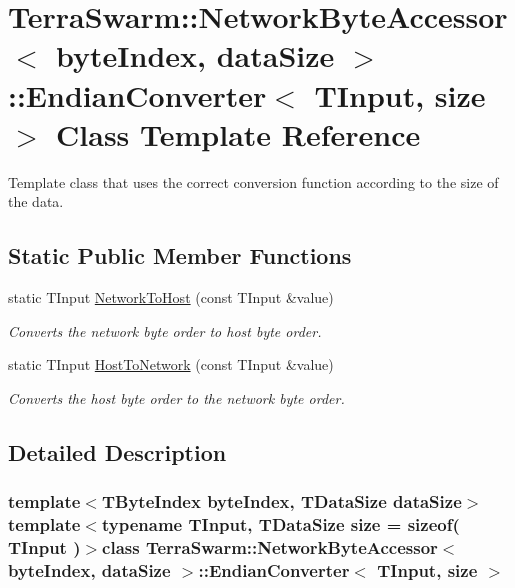 \hypertarget{class_terra_swarm_1_1_network_byte_accessor_1_1_endian_converter}{\section{Terra\-Swarm\-:\-:Network\-Byte\-Accessor$<$ byte\-Index, data\-Size $>$\-:\-:Endian\-Converter$<$ T\-Input, size $>$ Class Template Reference}
\label{class_terra_swarm_1_1_network_byte_accessor_1_1_endian_converter}
}


Template class that uses the correct conversion function according to the size of the data.  


\subsection*{Static Public Member Functions}
\begin{DoxyCompactItemize}
\item 
static T\-Input \hyperlink{class_terra_swarm_1_1_network_byte_accessor_1_1_endian_converter_aa33fe4997f3ec0957f43d003b925f224}{Network\-To\-Host} (const T\-Input \&value)
\begin{DoxyCompactList}\small\item\em Converts the network byte order to host byte order. \end{DoxyCompactList}\item 
static T\-Input \hyperlink{class_terra_swarm_1_1_network_byte_accessor_1_1_endian_converter_ab43849574a96cddb8f398d93afaf8f91}{Host\-To\-Network} (const T\-Input \&value)
\begin{DoxyCompactList}\small\item\em Converts the host byte order to the network byte order. \end{DoxyCompactList}\end{DoxyCompactItemize}


\subsection{Detailed Description}
\subsubsection*{template$<$T\-Byte\-Index byte\-Index, T\-Data\-Size data\-Size$>$template$<$typename T\-Input, T\-Data\-Size size = sizeof( T\-Input )$>$class Terra\-Swarm\-::\-Network\-Byte\-Accessor$<$ byte\-Index, data\-Size $>$\-::\-Endian\-Converter$<$ T\-Input, size $>$}

